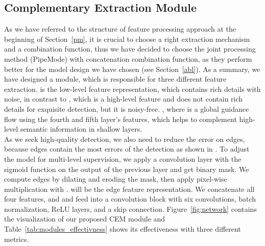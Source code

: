 \documentclass[10pt,twocolumn,letterpaper]{article}
\begin{document}
\subsection{Complementary Extraction Module}
As we have referred to the structure of feature processing approach at the beginning of Section~\ref{pm}, it is crucial to choose a right extraction mechanism and a combination function, thus we have decided to choose the joint processing method (PipeMode) with concatenation combination function, as they perform better for the model design we have chosen (see Section~\ref{abl}). As a summary, we have designed a module, which is responsible for three different feature extraction.  is the low-level feature representation, which contains rich details with noise, in contrast to , which is a high-level feature and does not contain rich details for exquisite detection, but it is noisy-free. , where  is a global guidance flow using the fourth and fifth layer's features, which helps to complement high-level semantic information in shallow layers. \\
As we seek high-quality detection, we also need to reduce the error on edges, because edges contain the most errors of the detection as shown in \cite{LDF}. To adjust the model for multi-level supervision, we apply a convolution layer with the sigmoid function on the output of the previous layer and get  binary mask.
We compute edges by dilating and eroding the  mask, then apply pixel-wise multiplication with .  will be the edge feature representation. We concatenate all four features,  and  and feed into a convolution block with six convolutions, batch normalization, ReLU layers, and a skip connection. Figure~\ref{fig:network} contains the visualization of our proposed CEM module and Table~\ref{tab:modules_effectivness} shows its effectiveness with three different metrics.
\end{document}
